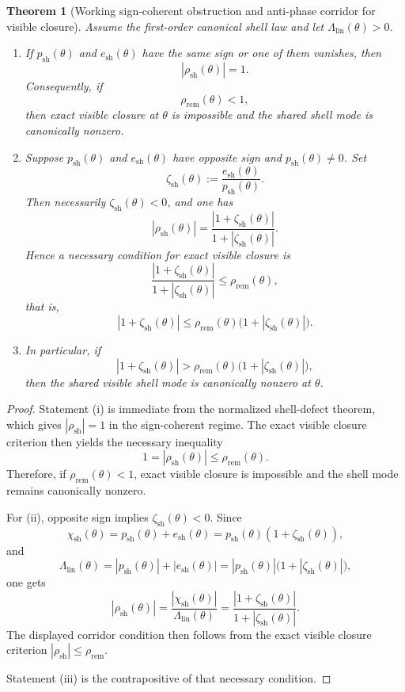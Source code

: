 \documentclass[12pt,a4paper]{article}
\newtheorem{theorem}{Theorem}[section]
\begin{document}
\begin{theorem}[Working sign-coherent obstruction and anti-phase corridor for visible closure]
Assume the first-order canonical shell law and let $\Lambda_{\mathrm{lin}}(\theta)>0$.
\begin{enumerate}[leftmargin=2em,label=(\roman*)]
\item If $p_{\mathrm{sh}}(\theta)$ and $e_{\mathrm{sh}}(\theta)$ have the same sign or one of them vanishes, then
\[
 |\rho_{\mathrm{sh}}(\theta)|=1.
\]
Consequently, if
\[
 \rho_{\mathrm{rem}}(\theta)<1,
\]
then exact visible closure at $\theta$ is impossible and the shared shell mode is canonically nonzero.
\item Suppose $p_{\mathrm{sh}}(\theta)$ and $e_{\mathrm{sh}}(\theta)$ have opposite sign and $p_{\mathrm{sh}}(\theta)\neq 0$. Set
\[
 \zeta_{\mathrm{sh}}(\theta):=\frac{e_{\mathrm{sh}}(\theta)}{p_{\mathrm{sh}}(\theta)}.
\]
Then necessarily $\zeta_{\mathrm{sh}}(\theta)<0$, and one has
\[
 |\rho_{\mathrm{sh}}(\theta)|
 =\frac{|1+\zeta_{\mathrm{sh}}(\theta)|}{1+|\zeta_{\mathrm{sh}}(\theta)|}.
\]
Hence a necessary condition for exact visible closure is
\[
 \frac{|1+\zeta_{\mathrm{sh}}(\theta)|}{1+|\zeta_{\mathrm{sh}}(\theta)|}
 \le
 \rho_{\mathrm{rem}}(\theta),
\]
that is,
\[
 |1+\zeta_{\mathrm{sh}}(\theta)|
 \le
 \rho_{\mathrm{rem}}(\theta)\bigl(1+|\zeta_{\mathrm{sh}}(\theta)|\bigr).
\]
\item In particular, if
\[
 |1+\zeta_{\mathrm{sh}}(\theta)|
 >
 \rho_{\mathrm{rem}}(\theta)\bigl(1+|\zeta_{\mathrm{sh}}(\theta)|\bigr),
\]
then the shared visible shell mode is canonically nonzero at $\theta$.
\end{enumerate}
\end{theorem}

\begin{proof}
Statement (i) is immediate from the normalized shell-defect theorem, which gives $|\rho_{\mathrm{sh}}|=1$ in the sign-coherent regime. The exact visible closure criterion then yields the necessary inequality
\[
 1=|\rho_{\mathrm{sh}}(\theta)|\le \rho_{\mathrm{rem}}(\theta).
\]
Therefore, if $\rho_{\mathrm{rem}}(\theta)<1$, exact visible closure is impossible and the shell mode remains canonically nonzero.

For (ii), opposite sign implies $\zeta_{\mathrm{sh}}(\theta)<0$. Since
\[
 \chi_{\mathrm{sh}}(\theta)=p_{\mathrm{sh}}(\theta)+e_{\mathrm{sh}}(\theta)=p_{\mathrm{sh}}(\theta)(1+\zeta_{\mathrm{sh}}(\theta)),
\]
and
\[
 \Lambda_{\mathrm{lin}}(\theta)=|p_{\mathrm{sh}}(\theta)|+|e_{\mathrm{sh}}(\theta)|=|p_{\mathrm{sh}}(\theta)|\bigl(1+|\zeta_{\mathrm{sh}}(\theta)|\bigr),
\]
one gets
\[
 |\rho_{\mathrm{sh}}(\theta)|
 =\frac{|\chi_{\mathrm{sh}}(\theta)|}{\Lambda_{\mathrm{lin}}(\theta)}
 =\frac{|1+\zeta_{\mathrm{sh}}(\theta)|}{1+|\zeta_{\mathrm{sh}}(\theta)|}.
\]
The displayed corridor condition then follows from the exact visible closure criterion $|\rho_{\mathrm{sh}}|\le \rho_{\mathrm{rem}}$.

Statement (iii) is the contrapositive of that necessary condition.
\end{proof}
\end{document}
